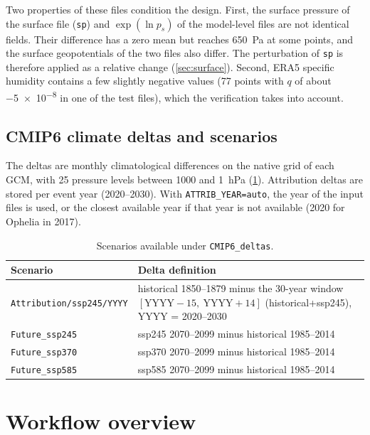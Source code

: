 \documentclass[11pt,a4paper]{article}
\newcommand{\code}[1]{\texttt{#1}}
\begin{document}
Two properties of these files condition the design. First, the surface
pressure of the surface file (\code{sp}) and $\exp(\ln p_s)$ of the
model-level files are not identical fields. Their difference has a zero mean
but reaches \SI{650}{Pa} at some points, and the surface geopotentials of the
two files also differ. The perturbation of \code{sp} is therefore applied as
a relative change (\cref{sec:surface}). Second, ERA5 specific humidity
contains a few slightly negative values (77 points with $q$ of about
\num{-5e-8} in one of the test files), which the verification takes into
account.

\subsection{CMIP6 climate deltas and scenarios}

The deltas are monthly climatological differences on the native grid of each
GCM, with 25 pressure levels between 1000 and \SI{1}{hPa}
(\cref{tab:scen}). Attribution deltas are stored per event year (2020--2030).
With \code{ATTRIB\_YEAR=auto}, the year of the input files is used, or the
closest available year if that year is not available (2020 for Ophelia in
2017).

\begin{table}[htbp]
\centering
\caption{Scenarios available under \code{CMIP6\_deltas}.}
\label{tab:scen}
\small
\begin{tabularx}{\linewidth}{lX}
\toprule
Scenario & Delta definition \\
\midrule
\code{Attribution/ssp245/YYYY} & historical 1850--1879 minus the 30-year window
  $[\mathrm{YYYY}-15,\ \mathrm{YYYY}+14]$ (historical+ssp245), YYYY = 2020--2030 \\
\code{Future\_ssp245} & ssp245 2070--2099 minus historical 1985--2014 \\
\code{Future\_ssp370} & ssp370 2070--2099 minus historical 1985--2014 \\
\code{Future\_ssp585} & ssp585 2070--2099 minus historical 1985--2014 \\
\bottomrule
\end{tabularx}
\end{table}

\section{Workflow overview}
\label{sec:overview}
\end{document}

